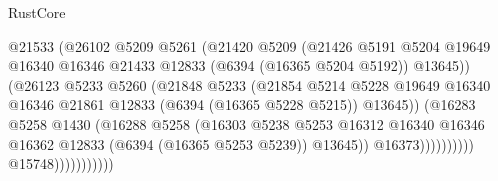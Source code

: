 \begin{lexlean}{RustCore}
\begin{coremodule}
                                        @21533
                                        (@26102
                                          @5209
                                          @5261
                                          (@21420
                                            @5209
                                            (@21426
                                              @5191
                                              @5204
                                              @19649
                                              @16340
                                              @16346
                                              @21433
                                              @12833
                                              (@6394 (@16365 @5204 @5192))
                                              @13645))
                                          (@26123
                                            @5233
                                            @5260
                                            (@21848
                                              @5233
                                              (@21854
                                                @5214
                                                @5228
                                                @19649
                                                @16340
                                                @16346
                                                @21861
                                                @12833
                                                (@6394 (@16365 @5228 @5215))
                                                @13645))
                                            (@16283
                                              @5258
                                              @1430
                                              (@16288
                                                @5258
                                                (@16303
                                                  @5238
                                                  @5253
                                                  @16312
                                                  @16340
                                                  @16346
                                                  @16362
                                                  @12833
                                                  (@6394 (@16365 @5253 @5239))
                                                  @13645))
                                              @16373))))))))))
                          @15748)))))))))))

\end{coremodule}
\end{lexlean}
